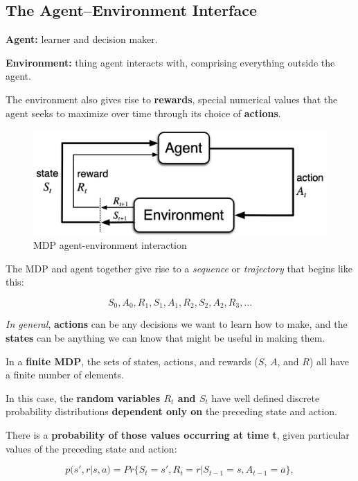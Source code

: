 \documentclass[12pt, a4paper]{article}
\begin{document}
\subsection{The Agent--Environment Interface }\label{agent-environment-interface}

\textbf{Agent:} learner and decision maker.

\textbf{Environment:} thing agent interacts with, comprising everything
outside the agent.

The environment also gives rise to \textbf{rewards}, special numerical
values that the agent seeks to maximize over time through its choice of
\textbf{actions}.


\begin{figure}[H]
  \centering  %
    \includegraphics[width=0.9\columnwidth]{images/MDP-agent-environment-interaction.png}
    \caption{MDP agent-environment interaction}
    \label{fig:fig3}
\end{figure}


The MDP and agent together give rise to a \emph{sequence} or
\emph{trajectory} that begins like this:

\[S_0, A_0, R_1, S_1, A_1, R_2, S_2, A_2, R_3,... \]

\emph{In general}, \textbf{actions} can be any decisions we want to
learn how to make, and the \textbf{states} can be anything we can know
that might be useful in making them.

In a \textbf{finite MDP}, the sets of states, actions, and rewards
(\(S\), \(A\), and \(R\)) all have a finite number of elements.

In this case, the \textbf{random variables \(R_t\) and \(S_t\)} have
well defined discrete probability distributions \textbf{dependent only
on} the preceding state and action.

There is a \textbf{probability of those values occurring at time t},
given particular values of the preceding state and action:

\[p(s', r|s, a) = Pr\{S_t = s', R_t =r | S_{t-1} = s, A_{t-1} = a\},\]
\end{document}
